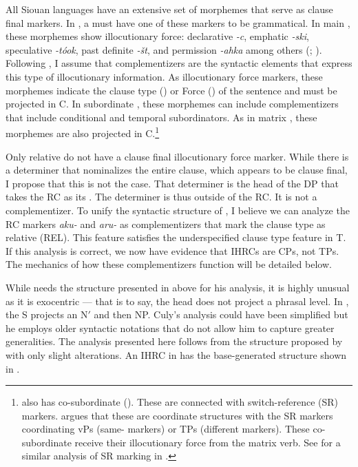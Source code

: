 \documentclass[output=paper]{LSP/langsci}
\begin{document}
	All Siouan languages have an extensive set of morphemes that serve as clause final markers. In , a  must have one of these markers to be grammatical. In main , these morphemes show illocutionary force: declarative \textit{-c}, emphatic \textit{-ski}, speculative \textit{-t\'ook}, past definite \textit{-\v{s}t}, and permission \textit{-ahka} among others (\citealt{Matthews1965}; \citealt{Boyle2007}). Following \citet{Rizzi1997}, I assume that complementizers are the syntactic elements that express this type of illocutionary information. As illocutionary force markers, these morphemes indicate the clause type (\citealt{Cheng1997}) or Force (\citealt{Chomsky1995}) of the sentence and must be projected in C. In subordinate , these morphemes can include complementizers that include conditional and temporal subordinators. As in matrix , these morphemes are also projected in C.\footnote{ also has co-subordinate  (\citealt{VanValinLaPolla1997}). These  are connected with switch-reference (SR) markers. \citet{Boyle2007} argues that these are coordinate structures with the SR markers coordinating vPs (same- markers) or TPs (different  markers). These co-subordinate  receive their illocutionary force from the matrix verb. See \citet{GordonTorres2012} for a similar analysis of SR marking in .}
	
Only relative  do not have a clause final illocutionary force marker.  While there is a determiner that nominalizes the entire clause, which appears to be clause final, I propose that this is not the case. That determiner is the head of the DP that takes the RC as its . The determiner is thus outside of the RC. It is not a complementizer. To unify the syntactic structure of , I believe we can analyze the RC markers \textit{aku-} and \textit{aru-} as complementizers that mark the clause type as relative (REL). This feature satisfies the underspecified clause type feature in T. If this analysis is correct, we now have evidence that IHRCs are CPs, not TPs. The mechanics of how these complementizers function will be detailed below.   
	
While \citeauthor{Culy1990} needs the structure presented in  above for his analysis, it is highly unusual as it is exocentric --- that is to say, the head does not project a phrasal level. In , the S projects an N$'$ and then NP. Culy's analysis could have been simplified but he employs older syntactic notations that do not allow him to capture greater generalities. The analysis presented here follows from the structure proposed by \citeauthor{Williamson1987} with only slight alterations. An IHRC in  has the base-generated structure shown in . 
\end{document}
